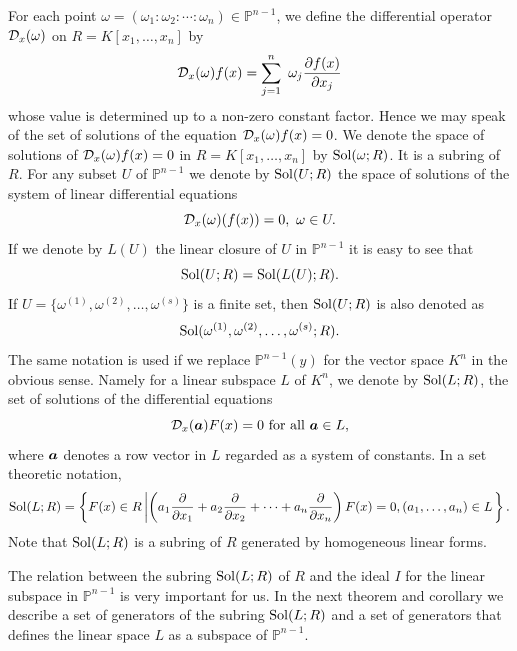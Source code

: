 \documentclass[12pt]{article}
\theoremstyle{definition}
\theoremstyle{remark}
\def\cD{{\cal D}}
\def\sol{{\rm Sol}}
\def\bolda{\mbox{\boldmath $a$}}
\def\pa{\partial}
\def\om{\omega}
\newcommand {\PP}{\mathbb{P}}
\begin{document}
For each point $\om=(\om_1:\om_2: \cdots : \om_n) \in \PP ^{n-1}$, 
we define the differential operator $\cD_x(\om)$  on $R=K[x_1, \ldots, x_n]$ by 
\[\cD_x(\om)f(x)= \sum _{j=1}^n\ \om_j \frac{\pa f(x)}{\pa x_j} \]
whose value is determined up to a non-zero constant factor.  Hence 
we may speak of the set of solutions  of the equation $\cD_x(\om)f(x)=0$.    
We denote the space of solutions  of $\cD_x(\om)f(x)=0$ in $R=K[x_1, \dots, x_n]$ 
by $\sol(\om;R)$.     
It is a subring of $R$.  
For any subset $U$ of $\PP ^{n-1}$ we denote by $\sol(U; R)$ the space of solutions 
 of the system of linear differential equations 
\[\cD_x(\om)(f(x))=0, \ \om  \in U.\]
If we denote by $L(U)$ the linear closure of  $U$   in $\PP ^{n-1}$ it is easy to see that  
\[\sol(U; R)=\sol(L(U); R).\]
If $U=\{\om ^{(1)}, \om ^{(2)}, \ldots , \om ^{(s)}\}$  is a finite set,  then  
$\sol(U;R)$ is also denoted as 
\[\sol(\om ^{(1)}, \om ^{(2)}, \ldots , \om ^{(s)}; R).\]
The same notation is used if we replace $\PP ^{n-1}(y)$ for the vector space $K^n$ in the obvious sense.  
Namely for a linear subspace $L$ of $K^n$, we denote by 
$\sol(L; R)$, the set of solutions of 
the differential equations 
\[ \cD_x(\bolda)F(x)  =0 {\mbox{ for all } \bolda \in L},\]
where $\bolda$ denotes a row vector in $L$ regarded as a system of constants.    
In a  set theoretic notation, 
\[\sol(L; R)=\left\{F(x) \in R \left| \left(a_1 \frac{\pa}{\pa x_1}+ a_2 \frac{\pa}{\pa x_2} + \cdots + a_n \frac{\pa}{\pa x_n}\right)F(x)=0, 
(a_1, \ldots, a_n) \in L   \right. \right\}. \]
Note that $\sol(L;R)$ is a subring of $R$ generated by homogeneous linear forms.
 
The relation between the subring $\sol(L; R)$ of $R$ and the ideal $I$ for the linear subspace in $\PP ^{n-1}$  is  very important for us.  
In the next theorem and corollary we describe a set of generators of the subring $\sol(L; R)$ and a set of generators that defines 
the linear space $L$ as a subspace of $\PP ^{n-1}$. 

\end{document}
